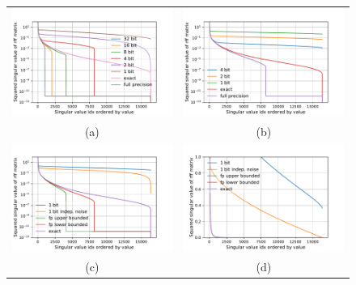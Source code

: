 \begin{figure}
	\centering
	\begin{tabular}{c c}
		\includegraphics[width=.45\linewidth]{figures/spectrum_1024.pdf} &
		\includegraphics[width=.45\linewidth]{figures/spectrum_8192.pdf}  \\
		(a) & (b) \\
		\includegraphics[width=.45\linewidth]{figures/different_spectrum_with_same_kernel_approx_error_log.pdf} &
		\includegraphics[width=.45\linewidth]{figures/different_spectrum_with_same_kernel_approx_error.pdf}\\
		(c) & (d)
	\end{tabular}

\end{figure}
